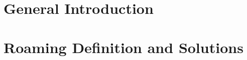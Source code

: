 \documentclass[12pt,a4paper,onecolumn,openright,oneside]{report}
\begin{document}
	
		
		
		
		
		
		
	
	\tableofcontents

	
	
	\listoffigures
	\begingroup
	\let\clearpage\relax
	\listoftables
	\endgroup

	\pagestyle{fancy}
	\fancyhead{}
	
	
	
	\renewcommand{\headrulewidth}{0pt}
	

	\chapter{General Introduction}
		

	\chapter{Roaming Definition and Solutions}
		
\end{document}

